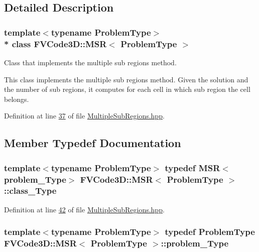 \subsection{Detailed Description}
\subsubsection*{template$<$typename Problem\+Type$>$\\*
class F\+V\+Code3\+D\+::\+M\+S\+R$<$ Problem\+Type $>$}

Class that implements the multiple sub regions method. 

This class implements the multiple sub regions method. Given the solution and the number of sub regions, it computes for each cell in which sub region the cell belongs. 

Definition at line \hyperlink{MultipleSubRegions_8hpp_source_l00037}{37} of file \hyperlink{MultipleSubRegions_8hpp_source}{Multiple\+Sub\+Regions.\+hpp}.



\subsection{Member Typedef Documentation}
\subsubsection[{\texorpdfstring{class\+\_\+\+Type}{class_Type}}]{\setlength{\rightskip}{0pt plus 5cm}template$<$typename Problem\+Type$>$ typedef {\bf M\+SR}$<${\bf problem\+\_\+\+Type}$>$ {\bf F\+V\+Code3\+D\+::\+M\+SR}$<$ Problem\+Type $>$\+::{\bf class\+\_\+\+Type}}\hypertarget{classFVCode3D_1_1MSR_a88e19436275c5ca4ed6629c2a3bb8480}{}\label{classFVCode3D_1_1MSR_a88e19436275c5ca4ed6629c2a3bb8480}


Definition at line \hyperlink{MultipleSubRegions_8hpp_source_l00042}{42} of file \hyperlink{MultipleSubRegions_8hpp_source}{Multiple\+Sub\+Regions.\+hpp}.

\subsubsection[{\texorpdfstring{problem\+\_\+\+Type}{problem_Type}}]{\setlength{\rightskip}{0pt plus 5cm}template$<$typename Problem\+Type$>$ typedef Problem\+Type {\bf F\+V\+Code3\+D\+::\+M\+SR}$<$ Problem\+Type $>$\+::{\bf problem\+\_\+\+Type}}\hypertarget{classFVCode3D_1_1MSR_aee0f8176a894e4f695baa08af10d14cf}{}\label{classFVCode3D_1_1MSR_aee0f8176a894e4f695baa08af10d14cf}


